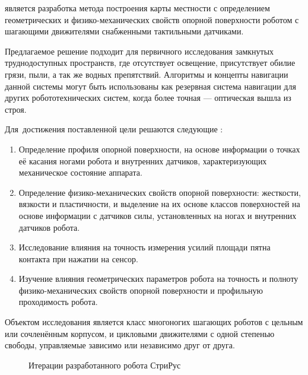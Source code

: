{\aim} является разработка метода построения карты местности с определением геометрических и физико-механических свойств опорной поверхности роботом с шагающими движителями снабженными тактильными датчиками.

Предлагаемое решение подходит для первичного исследования замкнутых труднодоступных пространств, где отсутствует освещение, присутствует обилие грязи, пыли, а так же водных препятствий. Алгоритмы и концепты навигации данной системы могут быть использованы как резервная система навигации для других робототехнических систем, когда более точная --- оптическая вышла из строя.

Для~достижения поставленной цели решаются следующие {\tasks}:
\begin{enumerate}[beginpenalty=10000] %
    \item Определение профиля опорной поверхности, на основе информации о точках её касания ногами робота и внутренних датчиков, характеризующих механическое состояние аппарата.
    \item Определение физико-механических свойств опорной поверхности: жесткости, вязкости и пластичности, и выделение на их основе классов поверхностей на основе информации с датчиков силы, установленных на ногах и внутренних датчиков робота.
    \item Исследование влияния на точность измерения усилий площади пятна контакта при нажатии на сенсор.
    \item Изучение влияния геометрических параметров робота на точность и полноту физико-механических свойств опорной поверхности и профильную проходимость робота.
\end{enumerate}

{\researchobj}
Объектом исследования является класс многоногих шагающих роботов с цельным или сочленённым корпусом, и цикловыми движителями с одной степенью свободы, управляемые зависимо или независимо друг от друга.

\begin{figure}[H]
    \caption{Итерации разработанного робота СтриРус}\label{fig:striruses}
  \end{figure}

